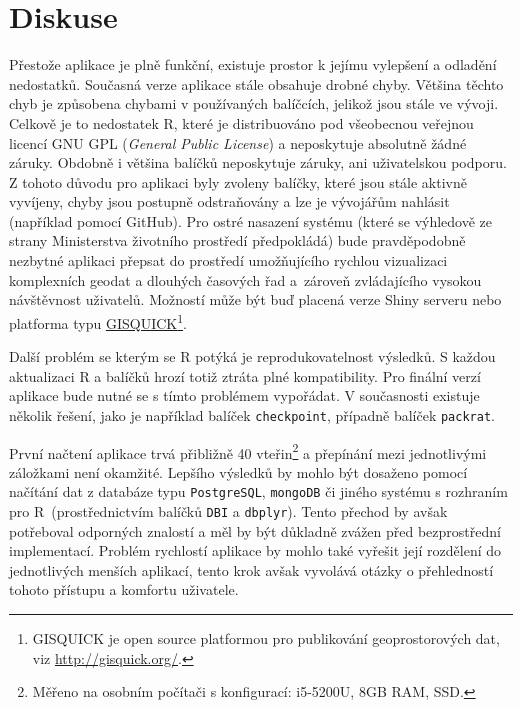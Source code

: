 \documentclass[12pt,]{article}
\let\rmarkdownfootnote\footnote%
\def\footnote{\protect\rmarkdownfootnote}
\begin{document}
\newpage

\hypertarget{diskuse}{\section{Diskuse}\label{diskuse}}

\qquad Přestože aplikace je plně funkční, existuje prostor k jejímu
vylepšení a odladění nedostatků. Současná verze aplikace stále obsahuje
drobné chyby. Většina těchto chyb je způsobena chybami v používaných
balíčcích, jelikož jsou stále ve vývoji. Celkově je to nedostatek R,
které je distribuováno pod všeobecnou veřejnou licencí GNU GPL
(\emph{General Public License}) a neposkytuje absolutně žádné záruky.
Obdobně i většina balíčků neposkytuje záruky, ani uživatelskou podporu.
Z tohoto důvodu pro aplikaci byly zvoleny balíčky, které jsou stále
aktivně vyvíjeny, chyby jsou postupně odstraňovány a lze je vývojářům
nahlásit (například pomocí GitHub). Pro ostré nasazení systému (které se
výhledově ze strany Ministerstva životního prostředí předpokládá) bude
pravděpodobně nezbytné aplikaci přepsat do prostředí umožňujícího
rychlou vizualizaci komplexních geodat a dlouhých časových řad a~zároveň
zvládajícího vysokou návštěvnost uživatelů. Možností může být buď
placená verze Shiny serveru nebo platforma typu
\href{http://gisquick.org/}{GISQUICK}\footnote{GISQUICK je open source
  platformou pro publikování geoprostorových dat, viz
  \url{http://gisquick.org/}.}.

\qquad Další problém se kterým se R potýká je reprodukovatelnost
výsledků. S každou aktualizaci R a balíčků hrozí totiž ztráta plné
kompatibility. Pro finální verzí aplikace bude nutné se s tímto
problémem vypořádat. V současnosti existuje několik řešení, jako je
například balíček \texttt{checkpoint}, případně balíček
\texttt{packrat}.

\qquad První načtení aplikace trvá přibližně 40 vteřin\footnote{Měřeno
  na osobním počítači s konfigurací: i5-5200U, 8GB RAM, SSD.} a
přepínání mezi jednotlivými záložkami není okamžité. Lepšího výsledků by
mohlo být dosaženo pomocí načítání dat z databáze typu
\texttt{PostgreSQL}, \texttt{mongoDB} či jiného systému s rozhraním pro
R~(prostřednictvím balíčků \texttt{DBI} a \texttt{dbplyr}). Tento
přechod by avšak potřeboval odporných znalostí a měl by být důkladně
zvážen před bezprostřední implementací. Problém rychlostí aplikace by
mohlo také vyřešit její rozdělení do jednotlivých menších aplikací,
tento krok avšak vyvolává otázky o přehledností tohoto přístupu a
komfortu uživatele.
\end{document}
